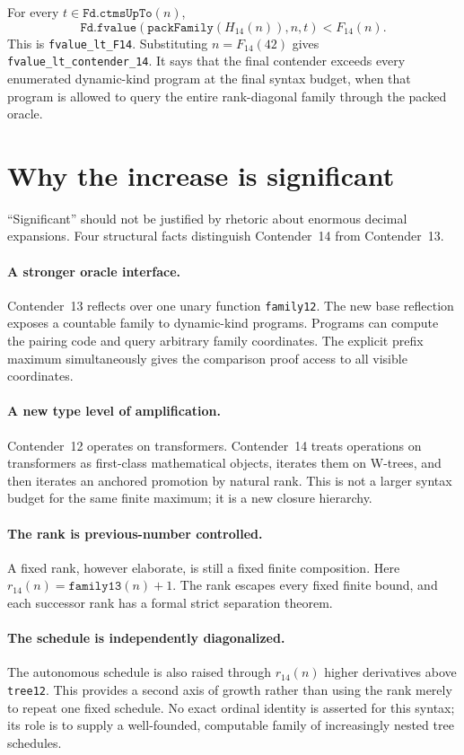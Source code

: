 \documentclass[11pt]{article}
\theoremstyle{definition}
\theoremstyle{remark}
\newcommand{\lean}[1]{\texttt{#1}}
\begin{document}
For every \(t\in\lean{Fd.ctmsUpTo}(n)\),
\[
\lean{Fd.fvalue}(\lean{packFamily}(H_{14}(n)),n,t)<F_{14}(n).
\]
This is \lean{fvalue\_lt\_F14}.  Substituting \(n=F_{14}(42)\) gives
\lean{fvalue\_lt\_contender\_14}.  It says that the final contender exceeds
every enumerated dynamic-kind program at the final syntax budget, when that
program is allowed to query the entire rank-diagonal family through the packed
oracle.

\section{Why the increase is significant}

``Significant'' should not be justified by rhetoric about enormous decimal
expansions.  Four structural facts distinguish Contender~14 from Contender~13.

\paragraph{A stronger oracle interface.}
Contender~13 reflects over one unary function \lean{family12}.  The new base
reflection exposes a countable family to dynamic-kind programs.  Programs can
compute the pairing code and query arbitrary family coordinates.  The explicit
prefix maximum simultaneously gives the comparison proof access to all visible
coordinates.

\paragraph{A new type level of amplification.}
Contender~12 operates on transformers.  Contender~14 treats operations on
transformers as first-class mathematical objects, iterates them on W-trees,
and then iterates an anchored promotion by natural rank.  This is not a larger
syntax budget for the same finite maximum; it is a new closure hierarchy.

\paragraph{The rank is previous-number controlled.}
A fixed rank, however elaborate, is still a fixed finite composition.  Here
\(r_{14}(n)=\lean{family13}(n)+1\).  The rank escapes every fixed finite bound,
and each successor rank has a formal strict separation theorem.

\paragraph{The schedule is independently diagonalized.}
The autonomous schedule is also raised through
\(r_{14}(n)\) higher derivatives above \lean{tree12}.  This provides a second
axis of growth rather than using the rank merely to repeat one fixed schedule.
No exact ordinal identity is asserted for this syntax; its role is to supply a
well-founded, computable family of increasingly nested tree schedules.
\end{document}
